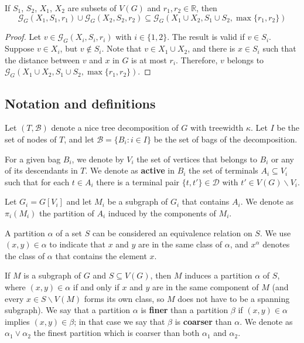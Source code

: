 \begin{fcorollary} \label{groupCor}
If \(S_1\), \(S_2\), \(X_1\), \(X_2\) are subsets of \(V(G)\) and \(r_1, r_2 \in \mathbb{R}\), then \[\mathcal{G}_G(X_1, S_1, r_1) \cup \mathcal{G}_G(X_2, S_2, r_2) \subseteq \mathcal{G}_G(X_1 \cup X_2, S_1 \cup S_2, \max\{r_1, r_2\})\]
\end{fcorollary}
\begin{proof}

Let \(v \in \mathcal{G}_G(X_i, S_i, r_i)\) with $i \in \{1,2\}$. The result is valid if \(v \in S_i\). Suppose \(v \in X_i\), but \(v \not\in S_i\). Note that \(v \in X_1 \cup X_2\), and there is \(x \in S_i\) such that the distance between \(v\) and \(x\) in \(G\) is at most \(r_i\). Therefore, \(v\) belongs to \(\mathcal{G}_G(X_1 \cup X_2, S_1 \cup S_2, \max\{r_1, r_2\})\).

\end{proof}

\subsection{Notation and definitions}

Let  \((T, \mathcal{B})\) denote a nice tree decomposition of \(G\) with treewidth \(\kappa\). Let \(I\) be the set of nodes of \(T\), and let \(\mathcal{B} = \{B_i \colon i \in I\}\) be the set of bags of the decomposition.

For a given bag \(B_i\), we denote by \(V_i\) the set of vertices that belongs to \(B_i\) or any of its descendants in \(T\). We denote as \textbf{active} in \(B_i\) the set of terminals \(A_i \subseteq V_i\) such that for each \(t \in A_i\) there is a terminal pair \(\{t, t'\} \in \mathcal{D}\) with \(t' \in V(G)\backslash V_i\).

Let \(G_i = G[V_i]\) and let \(M_i\) be a subgraph of \(G_i\) that contains \(A_i\). We denote as \(\pi_i(M_i)\) the partition of \(A_i\) induced by the components of \(M_i\).

A partition \(\alpha\) of a set \(S\) can be considered an equivalence relation on \(S\). We use \((x, y) \in \alpha\) to indicate that \(x\) and \(y\) are in the same class of \(\alpha\), and \(x^\alpha\) denotes the class of \(\alpha\) that contains the element \(x\).

If \(M\) is a subgraph of \(G\) and \(S \subseteq V(G)\), then \(M\) induces a partition \(\alpha\) of \(S\), where \((x, y) \in \alpha\) if and only if \(x\) and \(y\) are in the same component of \(M\) (and every \(x \in S \backslash V(M)\) forms its own class, so \(M\) does not have to be a spanning subgraph). We say that a partition \(\alpha\) is \textbf{finer} than a partition \(\beta\) if \((x, y) \in \alpha\) implies \((x, y) \in \beta\); in that case we say that \(\beta\) is \textbf{coarser} than \(\alpha\). We denote as \(\alpha_1 \vee \alpha_2\) the finest partition which is coarser than both \(\alpha_1\) and \(\alpha_2\).

